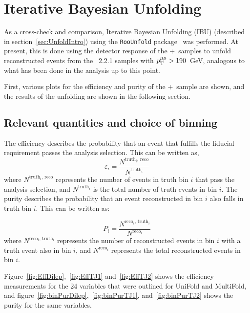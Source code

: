 \section{Iterative Bayesian Unfolding}
\label{app:IBU}

As a cross-check and comparison, Iterative Bayesian Unfolding (IBU) (described in section~\ref{sec:UnfoldIntro}) using the \texttt{RooUnfold} package~\cite{Adye:2011gm} was performed. At present, this is done using the detector response of the \powheg+\pythia~samples to unfold reconstructed events from the \sherpa~2.2.1 samples with $p_\mathrm{T}^{\mu\mu} > 190$~GeV, analogous to what has been done in the analysis up to this point.

First, various plots for the efficiency and purity of the \powheg+\pythia~sample are shown, and the results of the unfolding are shown in the following section.

\subsection{Relevant quantities and choice of binning}
The efficiency describes the probability that an event that fulfills the fiducial requirement passes the analysis selection. This can be written as,
\begin{equation}
  \varepsilon_i=\frac{N^{\text{truth$_i$, reco}}}{N^{\text{truth$_i$}}}
\end{equation}
where $N^{\text{truth$_i$, reco}}$ represents the number of events in truth bin $i$ that pass the analysis selection, and $N^{\text{truth$_i$}}$ is the total number of truth events in bin $i$. The purity describes the probability that an event reconstructed in bin $i$ also falls in truth bin $i$. This can be written as:

\begin{equation}
  P_i=\frac{N^{\text{reco$_i$, truth$_i$}}}{N^{\text{reco$_i$}}}
\end{equation}
where $N^{\text{reco$_i$, truth$_i$}}$ represents the number of reconstructed events in bin $i$ with a truth event also in bin $i$, and $N^{\text{reco$_i$}}$ represents the total reconstructed events in bin $i$.

Figure~\ref{fig:EffDilep},~\ref{fig:EffTJ1} and~\ref{fig:EffTJ2} shows the efficiency measurements for the 24 variables that were outlined for UniFold and MultiFold, and figure~\ref{fig:binPurDilep},~\ref{fig:binPurTJ1}, and~\ref{fig:binPurTJ2} shows the purity for the same variables.


